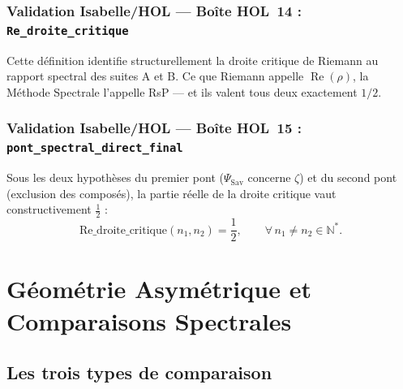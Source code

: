 \documentclass[]{pasj02}
\begin{document}
\subsubsection*{Validation Isabelle/HOL --- Boîte HOL~14 :
\texttt{Re\_droite\_critique}}

Cette définition identifie structurellement la droite critique de Riemann au
rapport spectral des suites A et B.  Ce que Riemann appelle
$\operatorname{Re}(\rho)$, la Méthode Spectrale l'appelle RsP --- et ils
valent tous deux exactement $1/2$.

\subsubsection*{Validation Isabelle/HOL --- Boîte HOL~15 :
\texttt{pont\_spectral\_direct\_final}}

\begin{theorem}
  Sous les deux hypothèses du premier pont ($\Psi_{\mathrm{Sav}}$ concerne
  $\zeta$) et du second pont (exclusion des composés), la partie réelle de
  la droite critique vaut constructivement $\tfrac{1}{2}$ :
  \[
    \mathrm{Re\_droite\_critique}(n_1,n_2) = \frac{1}{2},
    \qquad \forall\, n_1 \neq n_2 \in \mathbb{N}^*.
  \]
\end{theorem}

\section{Géométrie Asymétrique et Comparaisons Spectrales}
\label{sec:asymetrique}

\subsection{Les trois types de comparaison}
\label{ssec:types_comparaison}
\label{hol:rsp_asym_ordonnee}

\begin{table}
  \label{tab:comparaison}
\end{table}
\end{document}
